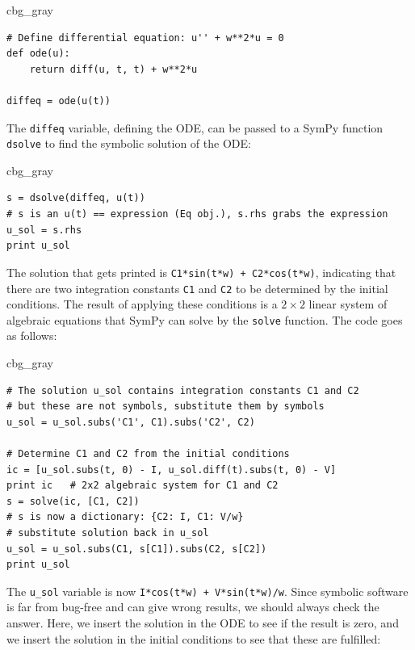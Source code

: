 \documentclass[graybox,envcountchap,sectrefs,final]{svmonodo}
\newenvironment{_cod_tight}[1]{
   \def\FrameCommand{\colorbox{#1}}
   \FrameRule0.6pt\MakeFramed {\FrameRestore}\vskip3mm}
   {\vskip0mm\endMakeFramed}
\newenvironment{cod}[1]{
\bgroup\rmfamily
\fboxsep=0mm\relax
\begin{_cod_tight}{#1}
\list{}{\parsep=-2mm\parskip=0mm\topsep=0pt\leftmargin=2mm
\rightmargin=2\leftmargin\leftmargin=4pt\relax}
\item\relax}
{\endlist\end{_cod_tight}\egroup}
\begin{document}
\begin{cod}{cbg_gray}\begin{Verbatim}[numbers=none,fontsize=\fontsize{9pt}{9pt},baselinestretch=0.95,xleftmargin=2mm]
# Define differential equation: u'' + w**2*u = 0
def ode(u):
    return diff(u, t, t) + w**2*u

diffeq = ode(u(t))
\end{Verbatim}
\end{cod}
\noindent
The \texttt{diffeq} variable, defining the ODE, can be passed to a SymPy
function \texttt{dsolve} to find the symbolic solution of the ODE:

\begin{cod}{cbg_gray}\begin{Verbatim}[numbers=none,fontsize=\fontsize{9pt}{9pt},baselinestretch=0.95,xleftmargin=2mm]
s = dsolve(diffeq, u(t))
# s is an u(t) == expression (Eq obj.), s.rhs grabs the expression
u_sol = s.rhs
print u_sol
\end{Verbatim}
\end{cod}
\noindent
The solution that gets printed is \texttt{C1*sin(t*w) + C2*cos(t*w)}, indicating
that there are two integration constants \texttt{C1} and \texttt{C2} to be determined
by the initial conditions. The result of applying these conditions is
a $2\times 2$ linear system of algebraic equations that SymPy can solve
by the \texttt{solve} function. The code goes as follows:

\begin{cod}{cbg_gray}\begin{Verbatim}[numbers=none,fontsize=\fontsize{9pt}{9pt},baselinestretch=0.95,xleftmargin=2mm]
# The solution u_sol contains integration constants C1 and C2
# but these are not symbols, substitute them by symbols
u_sol = u_sol.subs('C1', C1).subs('C2', C2)

# Determine C1 and C2 from the initial conditions
ic = [u_sol.subs(t, 0) - I, u_sol.diff(t).subs(t, 0) - V]
print ic   # 2x2 algebraic system for C1 and C2
s = solve(ic, [C1, C2])
# s is now a dictionary: {C2: I, C1: V/w}
# substitute solution back in u_sol
u_sol = u_sol.subs(C1, s[C1]).subs(C2, s[C2])
print u_sol
\end{Verbatim}
\end{cod}
\noindent
The \Verb!u_sol! variable is now \texttt{I*cos(t*w) + V*sin(t*w)/w}.
Since symbolic software is far from bug-free and can give wrong results,
we should always check the answer. Here, we insert the solution in the ODE
to see if the result is zero, and we insert the solution in the initial
conditions to see that these are fulfilled:
\end{document}
